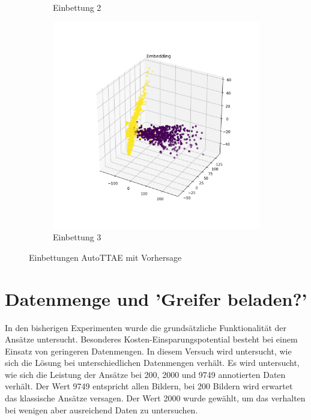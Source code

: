 \begin{figure}[h]
\begin{subfigure}[c]{0.32\textwidth}
			\caption{Einbettung 2}
			\label{img:AutoMLEinbettungV2}	
		\end{subfigure}
		\begin{subfigure}[c]{0.32\textwidth}			
			\includegraphics[width=1\textwidth, center]{bilder/Hauptteil/Step4_Data/Embedding_Auto_3.png}
			\caption{Einbettung 3}
			\label{img:AutoMLEinbettungV3}	
		\end{subfigure}
		\caption{Einbettungen AutoTTAE mit Vorhersage}
		\label{img:EmbeddingAutoMLTransfer}
	\end{figure}
	
	\section{Datenmenge und 'Greifer beladen?'}
	\label{sec:TransferDatenmenge}
	In den bisherigen Experimenten wurde die grundsätzliche Funktionalität der Ansätze untersucht. Besonderes  Kosten-Einsparungspotential besteht bei einem Einsatz von geringeren Datenmengen. In diesem Versuch wird untersucht, wie sich die Lösung bei unterschiedlichen Datenmengen verhält. Es wird untersucht, wie sich die Leistung der Ansätze bei 200, 2000 und 9749 annotierten Daten verhält. Der Wert 9749 entspricht allen Bildern, bei 200 Bildern wird erwartet das klassische Ansätze versagen. Der Wert 2000 wurde gewählt, um das verhalten bei wenigen aber ausreichend Daten zu untersuchen.
	

